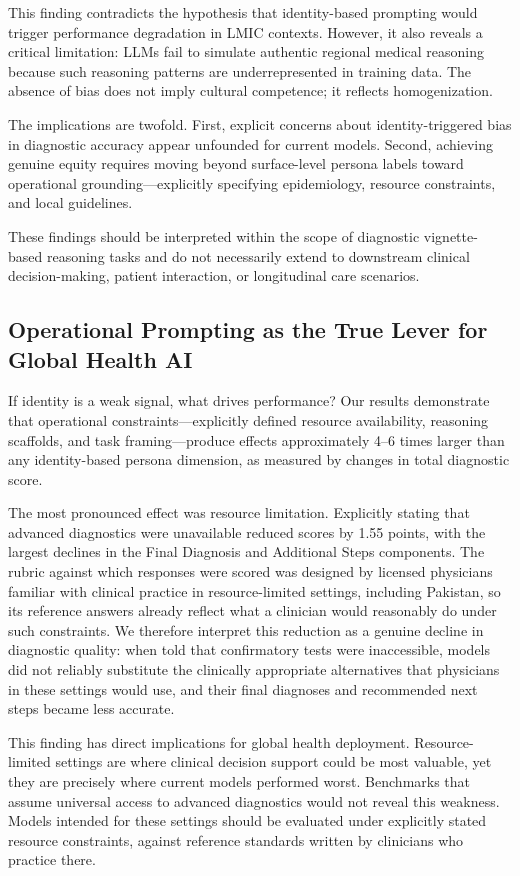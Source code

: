 \documentclass[sigconf]{acmart}
\begin{document}
This finding contradicts the hypothesis that identity-based prompting would trigger performance degradation in LMIC contexts. However, it also reveals a critical limitation: LLMs fail to simulate authentic regional medical reasoning because such reasoning patterns are underrepresented in training data. The absence of bias does not imply cultural competence; it reflects homogenization.

The implications are twofold. First, explicit concerns about identity-triggered bias in diagnostic accuracy appear unfounded for current models. Second, achieving genuine equity requires moving beyond surface-level persona labels toward operational grounding—explicitly specifying epidemiology, resource constraints, and local guidelines.

These findings should be interpreted within the scope of diagnostic vignette-based reasoning tasks and do not necessarily extend to downstream clinical decision-making, patient interaction, or longitudinal care scenarios.

\subsection{Operational Prompting as the True Lever for Global Health AI}

If identity is a weak signal, what drives performance? Our results demonstrate that operational constraints—explicitly defined resource availability, reasoning scaffolds, and task framing—produce effects approximately 4–6 times larger than any identity-based persona dimension, as measured by changes in total diagnostic score.

The most pronounced effect was resource limitation. Explicitly stating that advanced diagnostics were unavailable reduced scores by 1.55 points, with the largest declines in the Final Diagnosis and Additional Steps components. The rubric against which responses were scored was designed by licensed physicians familiar with clinical practice in resource-limited settings, including Pakistan, so its reference answers already reflect what a clinician would reasonably do under such constraints. We therefore interpret this reduction as a genuine decline in diagnostic quality: when told that confirmatory tests were inaccessible, models did not reliably substitute the clinically appropriate alternatives that physicians in these settings would use, and their final diagnoses and recommended next steps became less accurate.

This finding has direct implications for global health deployment. Resource-limited settings are where clinical decision support could be most valuable, yet they are precisely where current models performed worst. Benchmarks that assume universal access to advanced diagnostics would not reveal this weakness. Models intended for these settings should be evaluated under explicitly stated resource constraints, against reference standards written by clinicians who practice there.
\end{document}
